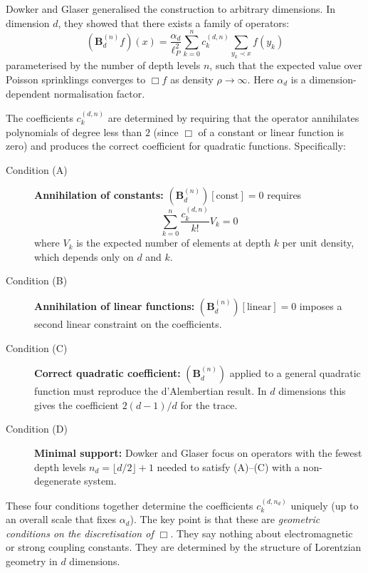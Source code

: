 \documentclass[12pt,a4paper]{article}
\begin{document}
Dowker and Glaser \cite{Dowker2013} generalised the construction to arbitrary dimensions.  In dimension $d$, they showed that there exists a family of operators:
\begin{equation}
  (\mathbf{B}_d^{(n)} f)(x) = \frac{\alpha_d}{\ell_P^2}\sum_{k=0}^{n} c_k^{(d,n)}\sum_{y_k\prec x}f(y_k)
  \label{eq:Bd_general}
\end{equation}
parameterised by the number of depth levels $n$, such that the expected value over Poisson sprinklings converges to $\Box f$ as density $\rho\to\infty$.  Here $\alpha_d$ is a dimension-dependent normalisation factor.

The coefficients $c_k^{(d,n)}$ are determined by requiring that the operator annihilates polynomials of degree less than $2$ (since $\Box$ of a constant or linear function is zero) and produces the correct coefficient for quadratic functions.  Specifically:

\begin{description}
  \item[Condition (A)] \textbf{Annihilation of constants:} $(\mathbf{B}_d^{(n)})[\text{const}]=0$ requires
  \begin{equation}
    \sum_{k=0}^{n}\frac{c_k^{(d,n)}}{k!}V_k = 0
    \label{eq:condA}
  \end{equation}
  where $V_k$ is the expected number of elements at depth $k$ per unit density, which depends only on $d$ and $k$.

  \item[Condition (B)] \textbf{Annihilation of linear functions:} $(\mathbf{B}_d^{(n)})[\text{linear}]=0$ imposes a second linear constraint on the coefficients.

  \item[Condition (C)] \textbf{Correct quadratic coefficient:} $(\mathbf{B}_d^{(n)})$ applied to a general quadratic function must reproduce the d'Alembertian result.  In $d$ dimensions this gives the coefficient $2(d-1)/d$ for the trace.

  \item[Condition (D)] \textbf{Minimal support:} Dowker and Glaser focus on operators with the fewest depth levels $n_d = \lfloor d/2\rfloor + 1$ needed to satisfy (A)--(C) with a non-degenerate system.
\end{description}

These four conditions together determine the coefficients $c_k^{(d,n_d)}$ uniquely (up to an overall scale that fixes $\alpha_d$).  The key point is that these are \emph{geometric conditions on the discretisation of $\Box$}.  They say nothing about electromagnetic or strong coupling constants.  They are determined by the structure of Lorentzian geometry in $d$ dimensions.
\end{document}

